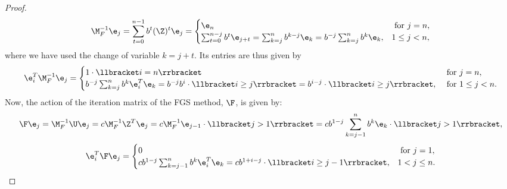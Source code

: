 \begin{proof}
\begin{equation*}
\M_{F}^{-1}\e_j = \sum_{t=0}^{n-1} b^t(\Z)^{t}\e_j =
\begin{cases}
\e_{n} &\mbox{ for } j=n, \\
\sum_{t=0}^{n-j} b^t\e_{j+t}=\sum_{k=j}^{n}
b^{k-j}\e_{k}=b^{-j}\sum_{k=j}^{n}b^{k}\e_{k}, & 1\leq j<n,
\end{cases}
\end{equation*}
%
where we have used the change of variable $k=j+t$. Its entries are thus given
by
\begin{equation*}
\e_i^T\M_{F}^{-1}\e_j =
\begin{cases}
1\cdot\llbracket i=n \rrbracket &\mbox{ for } j=n, \\
b^{-j}\sum_{k=j}^{n}b^{k}\e_i^T\e_{k}= b^{-j}b^{i}\cdot\llbracket i\geq
j\rrbracket=b^{i-j}\cdot\llbracket i\geq j\rrbracket, &\mbox{ for } 1\leq j<n.
\end{cases}
\end{equation*}
%
Now, the action of the iteration matrix of the FGS method, $\F$, is given by:
\begin{equation*}
\F\e_j=\M_F^{-1}\U\e_j=c\M_F^{-1}\Z^T\e_j=c\M_F^{-1}\e_{j-1}\cdot\llbracket
j>1\rrbracket=
cb^{1-j}\sum_{k=j-1}^{n}b^{k}\e_{k}\cdot\llbracket j>1 \rrbracket,
\end{equation*}
%
\begin{equation*}
\e_i^T\F\e_j=
\begin{cases}
0 &\mbox{ for } j=1, \\
cb^{1-j}\sum_{k=j-1}^{n}b^{k}\e_i^T\e_{k}= cb^{1+i-j}\cdot\llbracket i\geq
j-1\rrbracket, & 1< j\leq n.
\end{cases}
\end{equation*}


\end{proof}

